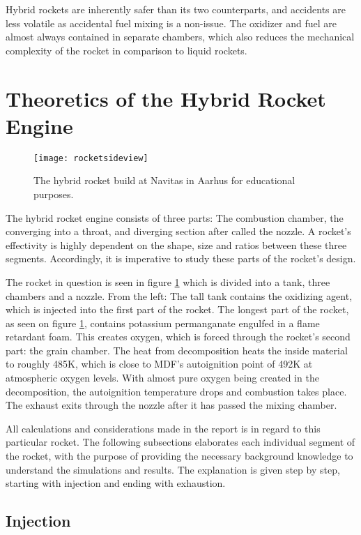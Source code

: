 	Hybrid rockets are inherently safer than its two counterparts, and accidents are less volatile as accidental fuel mixing is a non-issue. The oxidizer and fuel are almost always contained in separate chambers, which also reduces the mechanical complexity of the rocket in comparison to liquid rockets.

\section{Theoretics of the Hybrid Rocket Engine}

\begin{figure}
	\centering
	\texttt{[image: rocketsideview]}
	\caption{The hybrid rocket build at Navitas in Aarhus for educational purposes.}
	\label{fig:rocketpic}
\end{figure}

	The hybrid rocket engine consists of three parts: The combustion chamber, the converging into a throat, and diverging section after called the nozzle. A rocket's effectivity is highly dependent on the shape, size and ratios between these three segments. Accordingly, it is imperative to study these parts of the rocket's design.

	The rocket in question is seen in figure \ref{fig:rocketpic} which is divided into a tank, three chambers and a nozzle. From the left: The tall tank contains the oxidizing agent, which is injected into the first part of the rocket. The longest part of the rocket, as seen on figure \ref{fig:rocketpic}, contains potassium permanganate engulfed in a flame retardant foam. This creates oxygen, which is forced through the rocket's second part: the grain chamber. The heat from decomposition heats the inside material to roughly 485K, which is close to MDF's autoignition point of 492K at atmospheric oxygen levels. \cite{mdfAIT} With almost pure oxygen being created in the decomposition, the autoignition temperature drops and combustion takes place. The exhaust exits through the nozzle after it has passed the mixing chamber.

	All calculations and considerations made in the report is in regard to this particular rocket. The following subsections elaborates each individual segment of the rocket, with the purpose of providing the necessary background knowledge to understand the simulations and results. The explanation is given step by step, starting with injection and ending with exhaustion.


\subsection{Injection}

